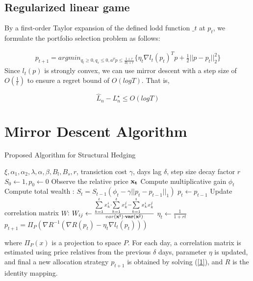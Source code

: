\subsection{Regularized linear game}

    By a first-order Taylor expansion of the defined lodd function $\_t$ at $p_t$, we formulate the portfolio selection problem as follows:

    \begin{align} \label{1}
    p_{t+1} = argmin_{q_l \geq 0, q_s \leq 0, a^Tp\leq \frac{1+r}{B_l+r}} \bigg\{\eta_t \nabla l_t(p_t)^Tp + \frac{1}{2}||p-p_t||_2^2\bigg\} 
    \end{align}
    \noindent Since $l_t(p)$ is strongly convex, we can use mirror descent with a step size of $O(\frac{1}{t})$ to ensure a regret bound of $O(log T)$. That is,

    $$\hat{L}_n - L_n^{\star} \leq O(log T)$$

\section{Mirror Descent Algorithm}

    \begin{algorithm}
        \caption{Proposed Algorithm for Structural Hedging}
        \begin{algorithmic}
            \State $\xi, \alpha_1, \alpha_2, \lambda, \alpha, \beta, B_l, B_s, r$, transiction cost $\gamma$, days lag $\delta$, step size decay factor $r$
            \State $S_0 \leftarrow 1, p_0 \leftarrow 0$
            \State Observe the relative price $\bf{x_t}$ 
            \State Compute multiplicative gain $\phi_t$
            \State Compute total wealth : $S_{t} = S_{t-1}(\phi_t-\gamma||p_t-p_{t-1}||_1)$
            \State $p_t \leftarrow p_{t-1}$
            \Else
            \State Update correlation matrix $W$: $W_{ij} \leftarrow \frac{\sum\limits_{k=1}^t x_k^i\cdot \sum\limits_{k=1}^t x_k^j - \sum\limits_{k=1}^t x_k^ix_k^j}{var(\bf{x^i})\cdot var(\bf{x^j})}$
            \State $\eta_t \leftarrow \frac{1}{1 + rt}$
            \State $p_{t+1} = \Pi_P (\nabla R^{-1}(\nabla R(p_t) - \eta_t \nabla l_t(p_t)))$
            \EndIf  
            \EndFor 
        \end{algorithmic}
    \end{algorithm}
where $\Pi_P(x)$ is a projection to space $P$.
For each day, a correlation matrix is estimated using price relatives from the previous $\delta$ days, parameter $\eta$ is updated, and final a new allocation strategy $p_{t+1}$ is obtained by solving (\ref{1}), and $R$ is the identity mapping. 


